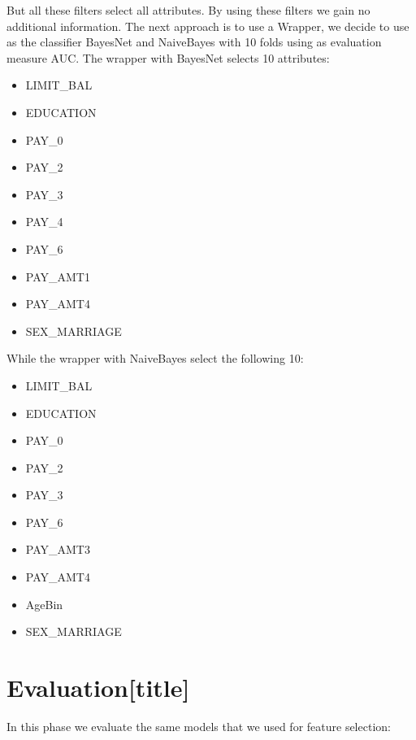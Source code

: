 \documentclass[fleqn,10pt]{SelfArx} %
\begin{document}
But all these filters select all attributes. By using these filters we gain no additional information.
The next approach is to use a Wrapper, we decide to use as the classifier BayesNet and NaiveBayes with 10 folds using as evaluation measure AUC.
The wrapper with BayesNet selects 10 attributes:
\begin{itemize}[noitemsep]
\item LIMIT\_BAL
\item EDUCATION
\item PAY\_0
\item PAY\_2
\item PAY\_3
\item PAY\_4
\item PAY\_6
\item PAY\_AMT1
\item PAY\_AMT4
\item SEX\_MARRIAGE
\end{itemize}
While the wrapper with NaiveBayes select the following 10:
\begin{itemize}[noitemsep]
	\item LIMIT\_BAL
	\item EDUCATION
	\item PAY\_0
	\item PAY\_2
	\item PAY\_3
	\item PAY\_6
	\item PAY\_AMT3
	\item PAY\_AMT4
	\item AgeBin
	\item SEX\_MARRIAGE
\end{itemize}
\section{Evaluation[title]}
In this phase we evaluate the same models that we used for feature selection: 
\end{document}
